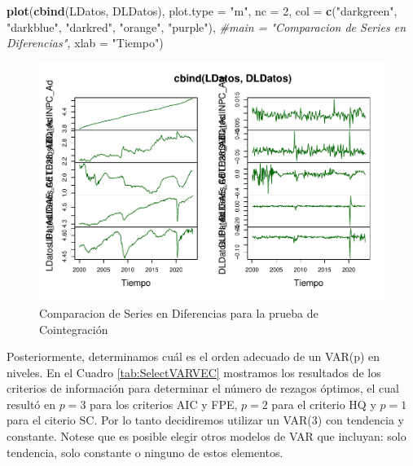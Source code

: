 \documentclass[
]{book}
\newenvironment{Shaded}{\begin{snugshade}}{\end{snugshade}}
\newcommand{\AttributeTok}[1]{\textcolor[rgb]{0.13,0.29,0.53}{#1}}
\newcommand{\CommentTok}[1]{\textcolor[rgb]{0.56,0.35,0.01}{\textit{#1}}}
\newcommand{\DecValTok}[1]{\textcolor[rgb]{0.00,0.00,0.81}{#1}}
\newcommand{\FunctionTok}[1]{\textcolor[rgb]{0.13,0.29,0.53}{\textbf{#1}}}
\newcommand{\NormalTok}[1]{#1}
\newcommand{\StringTok}[1]{\textcolor[rgb]{0.31,0.60,0.02}{#1}}
\begin{document}
\begin{Shaded}
\begin{Highlighting}[]
\FunctionTok{plot}\NormalTok{(}\FunctionTok{cbind}\NormalTok{(LDatos, DLDatos), }
     \AttributeTok{plot.type =} \StringTok{"m"}\NormalTok{, }\AttributeTok{nc =} \DecValTok{2}\NormalTok{,}
     \AttributeTok{col =} \FunctionTok{c}\NormalTok{(}\StringTok{"darkgreen"}\NormalTok{, }\StringTok{"darkblue"}\NormalTok{, }\StringTok{"darkred"}\NormalTok{, }\StringTok{"orange"}\NormalTok{, }\StringTok{"purple"}\NormalTok{), }
     \CommentTok{\#main = "Comparacion de Series en Diferencias", }
     \AttributeTok{xlab =} \StringTok{"Tiempo"}\NormalTok{)}
\end{Highlighting}
\end{Shaded}

\begin{figure}

{\centering \includegraphics{Notas-Series-Tiempo_files/figure-latex/fig83-1} 

}

\caption{Comparacion de Series en Diferencias para la prueba de Cointegración}\label{fig:fig83}
\end{figure}

Posteriormente, determinamos cuál es el orden adecuado de un VAR(p) en niveles. En el Cuadro \ref{tab:SelectVARVEC} mostramos los resultados de los criterios de información para determinar el número de rezagos óptimos, el cual resultó en \(p = 3\) para los criterios AIC y FPE, \(p = 2\) para el criterio HQ y \(p = 1\) para el citerio SC. Por lo tanto decidiremos utilizar un VAR(3) con tendencia y constante. Notese que es posible elegir otros modelos de VAR que incluyan: solo tendencia, solo constante o ninguno de estos elementos.
\end{document}
